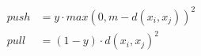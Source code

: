 \begin{align}
 \label{eqn:1}
  push &= y   \cdot max \left( 0, m - d \left( x_i, x_j \right) \right)^2\\[6pt]
 \label{eqn:2}
  pull &= \left( 1 - y \right)   \cdot d \left(x_i, x_j \right )^2\\
\end{align}

